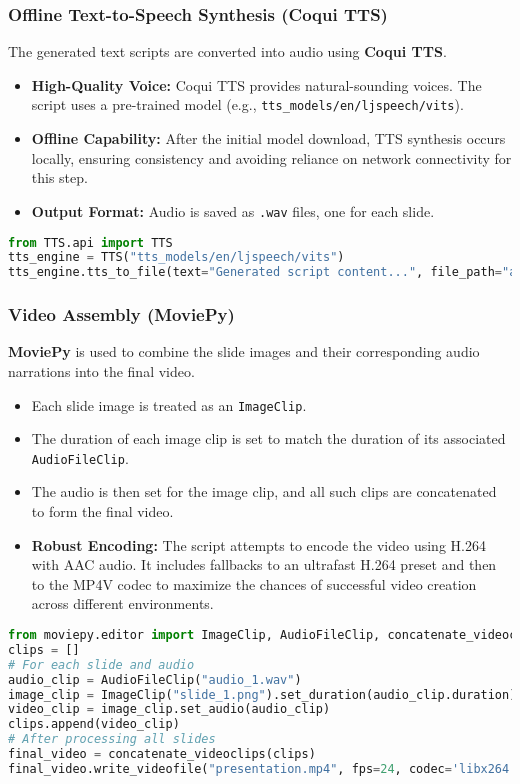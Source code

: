 \documentclass{article}
\begin{document}
\subsubsection{Offline Text-to-Speech Synthesis (Coqui TTS)}
The generated text scripts are converted into audio using \textbf{Coqui TTS}.
\begin{itemize}
    \item \textbf{High-Quality Voice:} Coqui TTS provides natural-sounding voices. The script uses a pre-trained model (e.g., \texttt{tts\_models/en/ljspeech/vits}).
    \item \textbf{Offline Capability:} After the initial model download, TTS synthesis occurs locally, ensuring consistency and avoiding reliance on network connectivity for this step.
    \item \textbf{Output Format:} Audio is saved as \texttt{.wav} files, one for each slide.
\end{itemize}
\begin{lstlisting}[language=Python, caption=Coqui TTS Synthesis (Conceptual)]
from TTS.api import TTS
tts_engine = TTS("tts_models/en/ljspeech/vits")
tts_engine.tts_to_file(text="Generated script content...", file_path="audio_1.wav")
\end{lstlisting}

\subsubsection{Video Assembly (MoviePy)}
\textbf{MoviePy} is used to combine the slide images and their corresponding audio narrations into the final video.
\begin{itemize}
    \item Each slide image is treated as an \texttt{ImageClip}.
    \item The duration of each image clip is set to match the duration of its associated \texttt{AudioFileClip}.
    \item The audio is then set for the image clip, and all such clips are concatenated to form the final video.
    \item \textbf{Robust Encoding:} The script attempts to encode the video using H.264 with AAC audio. It includes fallbacks to an ultrafast H.264 preset and then to the MP4V codec to maximize the chances of successful video creation across different environments.
\end{itemize}
\begin{lstlisting}[language=Python, caption=MoviePy Video Assembly (Conceptual)]
from moviepy.editor import ImageClip, AudioFileClip, concatenate_videoclips
clips = []
# For each slide and audio
audio_clip = AudioFileClip("audio_1.wav")
image_clip = ImageClip("slide_1.png").set_duration(audio_clip.duration)
video_clip = image_clip.set_audio(audio_clip)
clips.append(video_clip)
# After processing all slides
final_video = concatenate_videoclips(clips)
final_video.write_videofile("presentation.mp4", fps=24, codec='libx264', audio_codec='aac')
\end{lstlisting}
\end{document}
